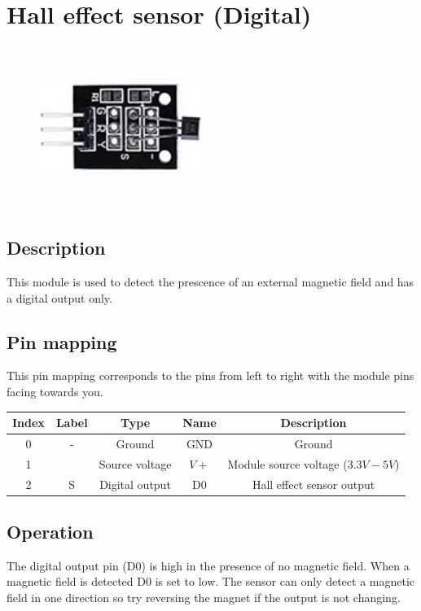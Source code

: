 \section{Hall effect sensor (Digital)}
\begin{figure}[H]
    \centering
    \includegraphics[angle=0, keepaspectratio=true, scale=1, width=200px, height=200px]{images/halleffect_digital.jpg}
\end{figure}
\subsection*{Description}
This module is used to detect the prescence of an external magnetic field and has a digital output only.
\subsection*{Pin mapping}
This pin mapping corresponds to the pins from left to right with the module pins facing towards you.
\begin{table}[H]
    \centering
    \begin{tabular}{|c|c|c|c|c|}
    \hline
    Index &Label &Type &Name &Description\\ \hline
    0 &- &Ground &GND &Ground\\ \hline
    1 & &Source voltage &$V+$ &Module source voltage ($3.3V - 5V$)\\ \hline
    2 &S &Digital output &D0 &Hall effect sensor output\\ \hline
    \end{tabular}
\end{table}
\subsection*{Operation}
The digital output pin (D0) is high in the presence of no magnetic field. When a magnetic field is detected D0 is set to low. The sensor can only detect a magnetic field in one direction so try reversing the magnet if the output is not changing.
%